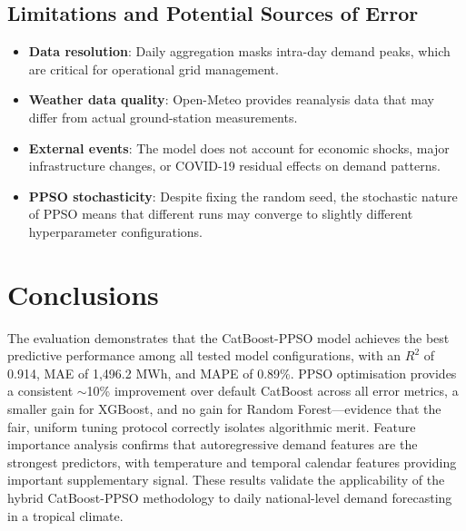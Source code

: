\subsection{Limitations and Potential Sources of Error}

\begin{itemize}
    \item \textbf{Data resolution}: Daily aggregation masks intra-day demand peaks, which are critical for operational grid management.
    \item \textbf{Weather data quality}: Open-Meteo provides reanalysis data that may differ from actual ground-station measurements.
    \item \textbf{External events}: The model does not account for economic shocks, major infrastructure changes, or COVID-19 residual effects on demand patterns.
    \item \textbf{PPSO stochasticity}: Despite fixing the random seed, the stochastic nature of PPSO means that different runs may converge to slightly different hyperparameter configurations.
\end{itemize}


\section{Conclusions}

The evaluation demonstrates that the CatBoost-PPSO model achieves the best predictive performance among all tested model configurations, with an $R^2$ of 0.914, MAE of 1{,}496.2 MWh, and MAPE of 0.89\%. PPSO optimisation provides a consistent $\sim$10\% improvement over default CatBoost across all error metrics, a smaller gain for XGBoost, and no gain for Random Forest---evidence that the fair, uniform tuning protocol correctly isolates algorithmic merit. Feature importance analysis confirms that autoregressive demand features are the strongest predictors, with temperature and temporal calendar features providing important supplementary signal. These results validate the applicability of the hybrid CatBoost-PPSO methodology to daily national-level demand forecasting in a tropical climate.

